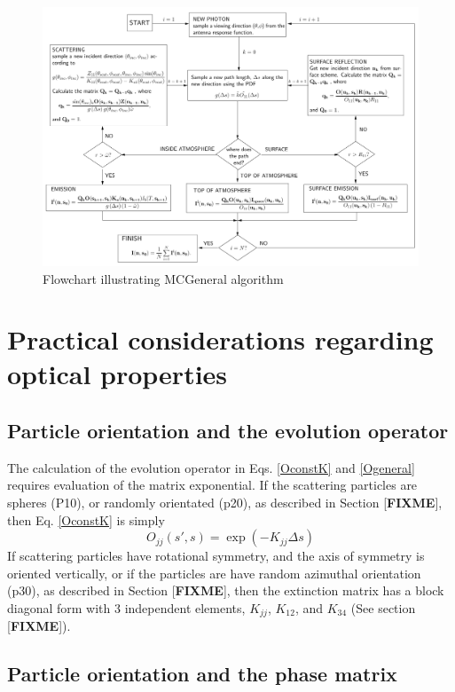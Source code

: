 \begin{figure}
\begin{center}
\includegraphics[width=\vsize,angle=90]{flowchart2}
\caption{Flowchart illustrating MCGeneral algorithm}
\end{center}
\label{fig:montecarlo:flowchart}
\end{figure}

\section{Practical considerations regarding optical properties}
\subsection{Particle orientation and the evolution operator}
The calculation of the evolution operator in Eqs. \ref{OconstK} and  \ref{Ogeneral} requires evaluation of the matrix exponential.  If the scattering particles are spheres (P10), or randomly orientated (p20), as described in Section [{\bf FIXME}], then Eq. \ref{OconstK} is simply
\begin{equation}
O_{jj}(s',s)=\exp\left(-K_{jj}\Delta s\right)
\label{OconstKp1020}
\end{equation}
If scattering particles have rotational symmetry, and the axis of symmetry is oriented vertically, or if the particles are have random azimuthal orientation (p30), as described in Section [{\bf FIXME}], then the extinction matrix has a 
block diagonal form with 3 independent elements, $K_{jj}$, $K_{12}$, and $K_{34}$ (See section [{\bf FIXME}]).

\subsection{Particle orientation and the phase matrix}
